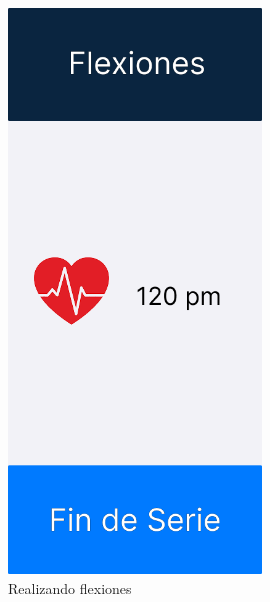 \begin{figure}[H]
   \centering
    \includegraphics[width=0.6\textwidth]{fotos/Frame 3.png}
    \caption{Realizando flexiones}
    \label{fig:Realizando flexiones}
\end{figure}
